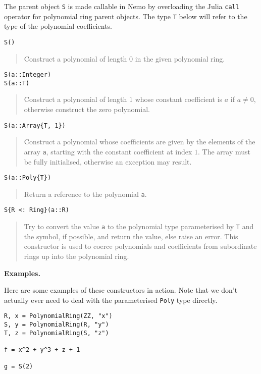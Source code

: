 \documentclass[a4paper,10pt]{article}
\newcommand{\code}{\lstinline}
\newcommand{\desc}[1]{\vspace{-3mm}\begin{quote}#1\end{quote}}
\begin{document}
{{The parent object \code{S} is made callable in Nemo by overloading the Julia
\code{call} operator for polynomial ring parent objects. The type \code{T}
below will refer to the type of the polynomial coefficients.

\begin{lstlisting}
S()
\end{lstlisting}

\desc{Construct a polynomial of length $0$ in the given polynomial ring.}

\begin{lstlisting}
S(a::Integer)
S(a::T)
\end{lstlisting}

\desc{Construct a polynomial of length $1$ whose constant coefficient is $a$ if
$a \neq 0$, otherwise construct the zero polynomial.}

\begin{lstlisting}
S(a::Array{T, 1})
\end{lstlisting}

\desc{Construct a polynomial whose coefficients are given by the elements of the array
\code{a}, starting with the constant coefficient at index $1$. The array must be fully
initialised, otherwise an exception may result.}

\begin{lstlisting}
S(a::Poly{T})
\end{lstlisting}

\desc{Return a reference to the polynomial \code{a}.}

\begin{lstlisting}
S{R <: Ring}(a::R)
\end{lstlisting}

\desc{Try to convert the value \code{a} to the polynomial type parameterised by 
\code{T} and the symbol, if possible, and return the value, else raise an error. 
This constructor is used to coerce polynomials and coefficients from subordinate rings up
into the polynomial ring.}

\textbf{Examples.}

Here are some examples of these constructors in action. Note that we don't actually
ever need to deal with the parameterised \code{Poly} type directly.

\begin{lstlisting}
R, x = PolynomialRing(ZZ, "x")
S, y = PolynomialRing(R, "y")
T, z = PolynomialRing(S, "z")

f = x^2 + y^3 + z + 1

g = S(2)


\end{lstlisting}}}
\end{document}

